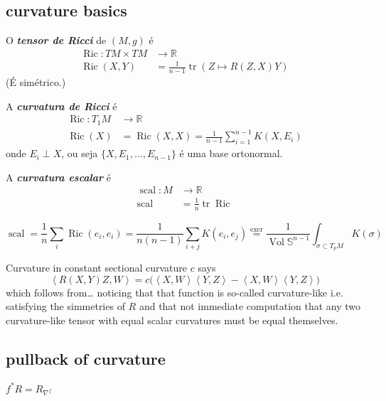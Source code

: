 \subsection{curvature basics}

O \textit{\textbf{tensor de Ricci}} de \((M,g)\) é
\begin{align*}
	\operatorname{Ric}: TM \times TM &\longrightarrow  \mathbb{R}\\
	 \operatorname{Ric}(X,Y)&= \frac{1}{n-1}\operatorname{tr}(Z  \mapsto R(Z,X)Y)
\end{align*}
(É simétrico.)

A \textit{\textbf{curvatura de Ricci}} é
\begin{align*}
	\operatorname{Ric}: T_1M &\longrightarrow \mathbb{R} \\
	\operatorname{Ric}(X) &=\operatorname{Ric}(X,X)=\frac{1}{n-1}\sum_{i=1}^{n-1}K(X,E_i)
\end{align*}
onde \(E_i \perp X\), ou seja \(\{X,E_1,\ldots,E_{n-1}\}\) é uma base ortonormal.

A \textit{\textbf{curvatura escalar}} é
\begin{align*}
	\operatorname{scal}: M &\longrightarrow \mathbb{R} \\
	\operatorname{scal} &=\frac{1}{n}\operatorname{tr}\operatorname{Ric} 
\end{align*}

\begin{exercise}\leavevmode
\[\operatorname{scal}=\frac{1}{n}\sum_{i}\operatorname{Ric}(e_i,e_i)=\frac{1}{n(n-1)}\sum_{i+j}K(e_i,e_j)\overset{\text{exer} }{=}\frac{1}{\operatorname{Vol}\mathbb{S}^{n-1}}\int_{\sigma \subset T_pM}K(\sigma)\]
\end{exercise}

Curvature in constant sectional curvature \(c\) says
\[\left<R(X,Y)Z,W\right>=c\Big(\left<X,W\right>\left<Y,Z\right>-\left<X,W\right>\left<Y,Z\right>\Big)\]
which follows from… noticing that that function is so-called curvature-like i.e. satisfying the simmetries of \(R\) and that not immediate computation that any two curvature-like tensor with equal scalar curvatures must be equal themselves.

\subsection{pullback of curvature}

\begin{exercise}\leavevmode
\(f^* R=R_{\nabla^f}\)
\end{exercise}


